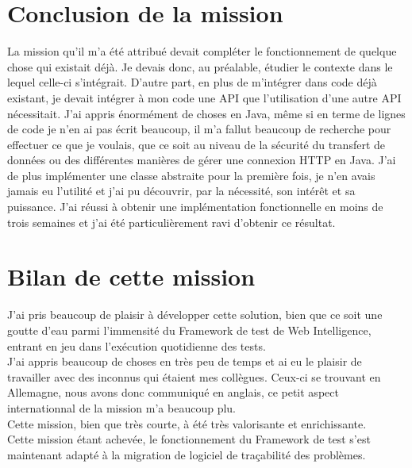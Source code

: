 \section{Conclusion de la mission}
La mission qu'il m'a été attribué devait compléter le fonctionnement de quelque chose qui existait déjà. Je devais donc, au préalable, étudier le contexte dans le lequel celle-ci s'intégrait. D'autre part, en plus de m'intégrer dans code déjà existant, je devait intégrer à mon code une API que l'utilisation d'une autre API nécessitait. J'ai appris énormément de choses en Java, même si en terme de lignes de code je n'en ai pas écrit beaucoup, il m'a fallut beaucoup de recherche pour effectuer ce que je voulais, que ce soit au niveau de la sécurité du transfert de données ou des différentes manières de gérer une connexion HTTP en Java. J'ai de plus implémenter une classe abstraite pour la première fois, je n'en avais jamais eu l'utilité et j'ai pu découvrir, par la nécessité, son intérêt et sa puissance. J'ai réussi à obtenir une implémentation fonctionnelle en moins de trois semaines et j'ai été particulièrement ravi d'obtenir ce résultat.



\section{Bilan de cette mission}

J'ai pris beaucoup de plaisir à développer cette solution, bien que ce soit une goutte d'eau parmi l'immensité du Framework de test de Web Intelligence, entrant en jeu dans l'exécution quotidienne des tests.\\
J'ai appris beaucoup de choses en très peu de temps et ai eu le plaisir de travailler avec des inconnus qui étaient mes collègues. Ceux-ci se trouvant en Allemagne, nous avons donc communiqué en anglais, ce petit aspect internationnal de la mission m'a beaucoup plu.\\
Cette mission, bien que très courte, à été très valorisante et enrichissante.\\

Cette mission étant achevée, le fonctionnement du Framework de test s'est maintenant adapté à la migration de logiciel de traçabilité des problèmes.


